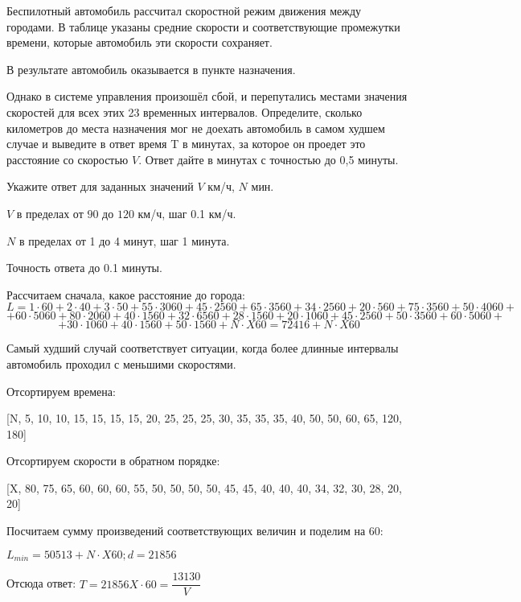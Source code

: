 Беспилотный
автомобиль рассчитал скоростной режим движения между городами. В таблице указаны средние скорости и соответствующие промежутки времени, которые автомобиль эти скорости сохраняет.


В результате автомобиль оказывается в пункте назначения.

Однако в системе
управления произошёл сбой, и перепутались местами значения
скоростей для всех этих 23 временных интервалов. 
Определите, сколько километров до места назначения мог не доехать
автомобиль в самом худшем случае и выведите в ответ время T в минутах, за которое он проедет это расстояние со скоростью $V$. Ответ дайте в минутах с точностью до 0,5 минуты.

Укажите ответ для заданных значений $V$ км/ч, $N$ мин.

\paramSection

$V$ в пределах от $90$ до $120$ км/ч, шаг  0.1 км/ч.  

$N$ в пределах от 1 до 4 минут, шаг  1 минута.

Точность ответа  до  0.1 минуты.

\solutionSection

Рассчитаем сначала, какое расстояние до города:
$$L=1 \cdot 60 +2 \cdot 40+ 3 \cdot 50+ 55 \cdot 3060+45 \cdot 2560+ 65 \cdot 3560+ 34 \cdot 2560+ 20 \cdot 560+ 75 \cdot 3560+ 50 \cdot 4060+$$
$$+ 60 \cdot 5060+80 \cdot 2060+40 \cdot 1560+ 32 \cdot 6560+ 28 \cdot 1560+20 \cdot 1060+ 45 \cdot 2560+ 50 \cdot 3560+ 60 \cdot 5060+$$
$$+30 \cdot 1060+40 \cdot 1560+50 \cdot 1560+N \cdot X60=72416+N \cdot X60$$  

Самый худший случай соответствует ситуации, когда более длинные интервалы автомобиль проходил с меньшими скоростями.

Отсортируем времена:

[N, 5, 10, 10, 15, 15, 15, 15, 20, 25, 25, 25, 30, 35, 35, 35, 40, 50, 50, 60, 65, 120, 180]

Отсортируем скорости в обратном порядке:

[X, 80, 75, 65, 60, 60, 60, 55, 50, 50, 50, 50, 45, 45, 40, 40, 40, 34, 32, 30, 28, 20, 20] 

Посчитаем сумму произведений соответствующих величин и поделим на 60:

$L_{min}=50513+N \cdot X60  ;  d=21856$

Отсюда ответ: $ T=21856 X \cdot 60= \dfrac{13130}{V}$

